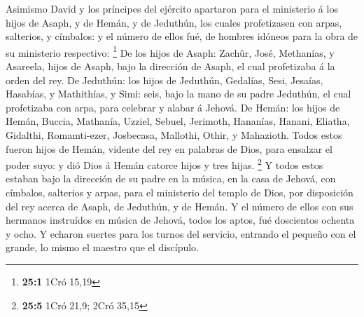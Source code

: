  Asimismo David y los príncipes del ejército apartaron
para el ministerio á los hijos de Asaph, y de Hemán, y de Jeduthún, los
cuales profetizasen con arpas, salterios, y címbalos: y el número de
ellos fué, de hombres idóneos para la obra de su ministerio respectivo:
\footnote{\textbf{25:1} 1Cró 15,19}  De los hijos de
Asaph: Zachûr, José, Methanías, y Asareela, hijos de Asaph, bajo la
dirección de Asaph, el cual profetizaba á la orden del rey.
 De Jeduthún: los hijos de Jeduthún, Gedalías, Sesi,
Jesaías, Hasabías, y Mathithías, y Simi: seis, bajo la mano de su padre
Jeduthún, el cual profetizaba con arpa, para celebrar y alabar á Jehová.
 De Hemán: los hijos de Hemán, Buccia, Mathanía, Uzziel,
Sebuel, Jerimoth, Hananías, Hanani, Eliatha, Gidalthi, Romamti-ezer,
Josbecasa, Mallothi, Othir, y Mahazioth.  Todos estos
fueron hijos de Hemán, vidente del rey en palabras de Dios, para
ensalzar el poder suyo: y dió Dios á Hemán catorce hijos y tres hijas.
\footnote{\textbf{25:5} 1Cró 21,9; 2Cró 35,15}  Y todos
estos estaban bajo la dirección de su padre en la música, en la casa de
Jehová, con címbalos, salterios y arpas, para el ministerio del templo
de Dios, por disposición del rey acerca de Asaph, de Jeduthún, y de
Hemán.  Y el número de ellos con sus hermanos instruídos
en música de Jehová, todos los aptos, fué doscientos ochenta y ocho.
 Y echaron suertes para los turnos del servicio, entrando
el pequeño con el grande, lo mismo el maestro que el discípulo.

